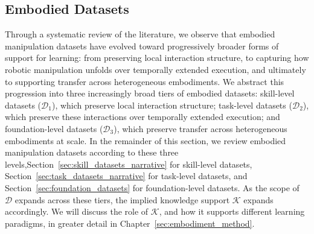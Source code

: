 \documentclass[acmsmall,screen,review]{acmart}
\begin{document}
\subsection{Embodied Datasets}\label{sec:eai_datasets}

Through a systematic review of the literature, we observe that embodied manipulation datasets have evolved toward progressively broader forms of support for learning: from preserving local interaction structure, to capturing how robotic manipulation unfolds over temporally extended execution, and ultimately to supporting transfer across heterogeneous embodiments.
We abstract this progression into three increasingly broad tiers of embodied datasets: skill-level datasets ($\mathcal{D}_1$), which preserve local interaction structure; task-level datasets ($\mathcal{D}_2$), which preserve these interactions over temporally extended execution; and foundation-level datasets ($\mathcal{D}_3$), which preserve transfer across heterogeneous embodiments at scale.
In the remainder of this section, we review embodied manipulation datasets according to these three levels,Section~\ref{sec:skill_datasets_narrative} for skill-level datasets, Section~\ref{sec:task_datasets_narrative} for task-level datasets, and Section~\ref{sec:foundation_datasets} for foundation-level datasets.
As the scope of $\mathcal{D}$ expands across these tiers, the implied knowledge support $\mathcal{K}$ expands accordingly.
We will discuss the role of $\mathcal{K}$, and how it supports different learning paradigms, in greater detail in Chapter~\ref{sec:embodiment_method}.
\end{document}
